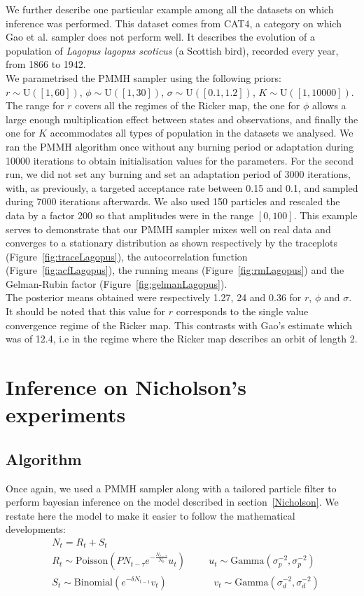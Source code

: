\documentclass[12pt]{article}
\begin{document}
	We further describe one particular example among all the datasets on which inference was performed. This dataset comes from CAT4, a category on which Gao et al. sampler does not perform well. It describes the evolution of a population of \emph{Lagopus lagopus scoticus} (a Scottish bird), recorded every year, from 1866 to 1942. \\
	We parametrised the PMMH sampler using the following priors: $r \sim \mathrm{U}([1, 60])$, $\phi \sim \mathrm{U}([1, 30])$, $\sigma \sim \mathrm{U}([0.1, 1.2])$, $K \sim \mathrm{U}([1, 10000])$. The range for $r$ covers all the regimes of the Ricker map, the one for $\phi$ allows a large enough multiplication effect between states and observations, and finally the one for $K$ accommodates all types of population in the datasets we analysed. We ran the PMMH algorithm once without any burning period or adaptation during 10000 iterations to obtain initialisation values for the parameters. For the second run, we did not set any burning and set an adaptation period of 3000 iterations, with, as previously, a targeted acceptance rate between 0.15 and 0.1, and sampled during 7000 iterations afterwards. We also used 150 particles and rescaled the data by a factor 200 so that amplitudes were in the range $[0, 100]$. This example serves to demonstrate that our PMMH sampler mixes well on real data and converges to a stationary distribution as shown respectively by the traceplots (Figure~\ref{fig:traceLagopus}), the autocorrelation function (Figure~\ref{fig:acfLagopus}), the running means (Figure~\ref{fig:rmLagopus}) and the Gelman-Rubin factor (Figure~\ref{fig:gelmanLagopus}). \\
	The posterior means obtained were respectively 1.27, 24 and 0.36 for $r$, $\phi$ and $\sigma$. It should be noted that this value for $r$ corresponds to the single value convergence regime of the Ricker map. This contrasts with Gao's estimate which was of 12.4, i.e in the regime where the Ricker map describes an orbit of length 2. 
	
	\section{Inference on Nicholson's experiments} \label{infNicholson}
	\subsection{Algorithm}
		Once again, we used a PMMH sampler along with a tailored particle filter to perform bayesian inference on the model described in section~\ref{Nicholson}. We restate here the model to make it easier to follow the mathematical developments:
		\begin{align*}
		& N_t = R_t + S_t \\
		& R_t \sim  \mathrm{Poisson}(PN_{t-\tau}e^{-\frac{N_{t-\tau}}{N_0}}u_t)  \hspace{1cm} u_t \sim \mathrm{Gamma}(\sigma_p^{-2}, \sigma_p^{-2})\\ 
		& S_t \sim \mathrm{Binomial}(e^{-\delta N_{t-1}}v_t) \hspace{2cm}  v_t \sim \mathrm{Gamma}(\sigma_d^{-2}, \sigma_d^{-2}) 
		\end{align*}
\end{document}
